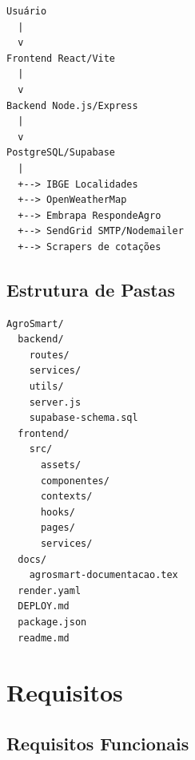 \documentclass[
  12pt,
  oneside,
  a4paper,
  brazil
]{abntex2}
\begin{document}
\begin{verbatim}
Usuário
  |
  v
Frontend React/Vite
  |
  v
Backend Node.js/Express
  |
  v
PostgreSQL/Supabase
  |
  +--> IBGE Localidades
  +--> OpenWeatherMap
  +--> Embrapa RespondeAgro
  +--> SendGrid SMTP/Nodemailer
  +--> Scrapers de cotações
\end{verbatim}


\section{Estrutura de Pastas}

\begin{verbatim}
AgroSmart/
  backend/
    routes/
    services/
    utils/
    server.js
    supabase-schema.sql
  frontend/
    src/
      assets/
      componentes/
      contexts/
      hooks/
      pages/
      services/
  docs/
    agrosmart-documentacao.tex
  render.yaml
  DEPLOY.md
  package.json
  readme.md
\end{verbatim}

\chapter{Requisitos}

\section{Requisitos Funcionais}
\end{document}
